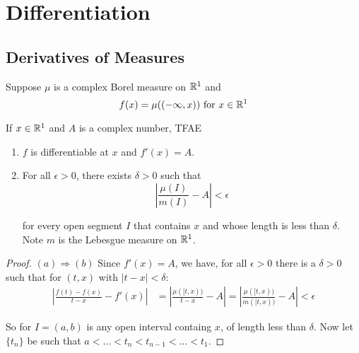 
\usepackage{makeidx}
\makeindex


\section{Differentiation}
\subsection{Derivatives of Measures}
\begin{theorem}
    Suppose $\mu$ is a complex Borel measure on $\mathbb{R}^1$ and \begin{equation}
        f(x) = \mu((-\infty, x)) \text{ for }x\in \mathbb{R}^1
    \end{equation}

    If $x\in \mathbb{R}^1$ and $A$ is a complex number, TFAE\begin{enumerate}[label = (\alph*)]
        \item $f$ is differentiable at $x$ and $f'(x) = A$.
        \item For all $\epsilon>0$, there exists $\delta>0$ such that\begin{equation}
            |\frac{\mu(I)}{m(I)}-A|<\epsilon
        \end{equation}

        for every open segment $I$ that contains $x$ and whose length is less than $\delta$. Note $m$ is the Lebesgue measure on $\mathbb{R}^1$.
    \end{enumerate}

    \begin{proof}
        $(a)\Rightarrow (b)$         
        Since $f'(x) = A$, we have, for all $\epsilon>0$ there is a $\delta>0$ such that for $(t,x)$ with $|t-x|<\delta$:\begin{align*}
            |\frac{f(t)-f(x)}{t-x} - f'(x)| &= |\frac{\mu([t,x))}{t-x} - A| = |\frac{\mu([t,x))}{m([t,x))} - A| <\epsilon \tag{$\dagger$}
        \end{align*}

        So for $I = (a,b)$ is any open interval containg $x$, of length less than $\delta$. Now let $\{t_n\}$ be such that $a<\ldots<t_n<t_{n-1}<\ldots < t_1$.
    \end{proof}
\end{theorem}

